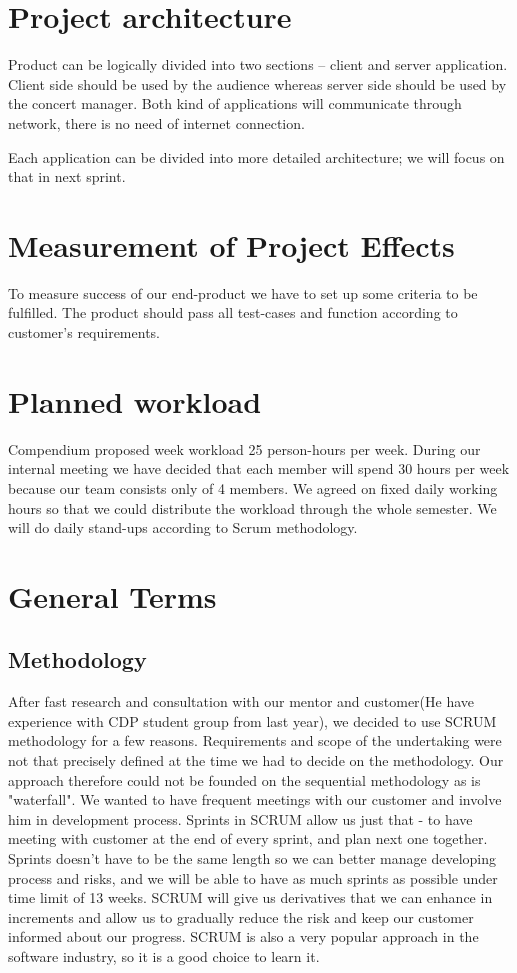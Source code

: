 \documentclass{article}
\begin{document}
\section{Project architecture}
Product can be logically divided into two sections -- client and server application.
Client side should be used by the audience whereas server side should be used by the concert manager.
Both kind of applications will communicate through network, there is no need of internet connection.

Each application can be divided into more detailed architecture; we will focus on that in next sprint.


\section{Measurement of Project Effects}
To measure success of our end-product we have to set up some criteria to be fulfilled. The product should pass all test-cases and function according to customer's requirements.

\section{Planned workload}
Compendium proposed week workload 25 person-hours per week. During our internal meeting we have decided that each member will spend 30 hours per week because our team consists only of 4 members. We agreed on fixed daily working hours so that we could distribute the workload through the whole semester. We will do daily stand-ups according to Scrum methodology.

\section{General Terms}
\subsection{Methodology}
After fast research and consultation with our mentor and customer(He have experience with CDP student group from last year), we decided to use SCRUM methodology for a 
few reasons. Requirements and scope of the undertaking were not that precisely defined at the time 
we had to decide on the methodology. Our approach therefore could not be founded on the sequential methodology as is "waterfall".
We wanted to have frequent meetings with our customer and involve him in development process. Sprints in SCRUM allow us just that - 
to have meeting with customer at the end of every sprint, and plan next one together. Sprints doesn't have to be the same length so 
we can better manage developing process and risks, and we will be able to have as much sprints as possible under time limit of 13 weeks. 
SCRUM will give us derivatives that we can enhance in increments and allow us to gradually reduce the risk and keep our customer informed 
about our progress. SCRUM is also a very popular approach in the software industry, so it is a good choice to learn it. 
\end{document}
